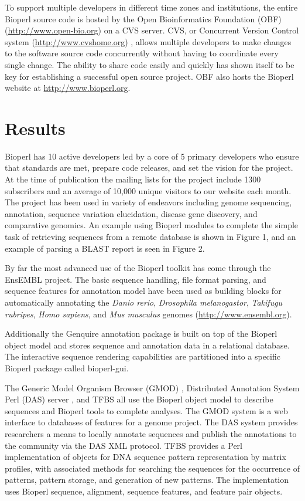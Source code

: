 \documentclass[12pt]{article}
\begin{document}
To support multiple developers in different time zones and
institutions, the entire Bioperl source code is hosted by the Open
Bioinformatics Foundation (OBF) (\url{http://www.open-bio.org}) on a
CVS server.  CVS, or Concurrent Version Control system
(\url{http://www.cvshome.org}) \cite{cvsbook}, allows multiple
developers to make changes to the software source code concurrently
without having to coordinate every single change.  The ability to
share code easily and quickly has shown itself to be key for
establishing a successful open source project.  OBF also hosts the
Bioperl website at \url{http://www.bioperl.org}.

\section{Results}

Bioperl has 10 active developers led by a core of 5 primary developers
who ensure that standards are met, prepare code releases, and set the
vision for the project.  At the time of publication the mailing lists
for the project include 1300 subscribers and an average of 10,000
unique visitors to our website each month.  The project has been used
in variety of endeavors including genome sequencing, annotation,
sequence variation elucidation, disease gene discovery, and
comparative genomics.  An example using Bioperl modules to complete
the simple task of retrieving sequences from a remote database is
shown in Figure 1, and an example of parsing a BLAST report is
seen in Figure 2.

By far the most advanced use of the Bioperl toolkit has come through
the EnsEMBL \cite{ensembl-nar} project.  The basic sequence handling,
file format parsing, and sequence features for annotation model have
been used as building blocks for automatically annotating the
\textit{Danio rerio}, \textit{Drosophila melanogastor},
\textit{Takifugu rubripes}, \textit{Homo sapiens}, and \textit{Mus
musculus} genomes (\url{http://www.ensembl.org}).

Additionally the Genquire \cite{genquire} annotation package is built
on top of the Bioperl object model and stores sequence and annotation
data in a relational database.  The interactive sequence rendering
capabilities are partitioned into a specific Bioperl package called
bioperl-gui.

The Generic Model Organism Browser (GMOD) \cite{gmod}, Distributed
Annotation System Perl (DAS) server \cite{das}, and TFBS
\cite{tfbs} all use the Bioperl object model to describe sequences and
Bioperl tools to complete analyses.  The GMOD system is a web
interface to databases of features for a genome project.  The DAS
system provides researchers a means to locally annotate sequences and
publish the annotations to the community via the DAS XML protocol.
TFBS provides a Perl implementation of objects for DNA sequence pattern
representation by matrix profiles, with associated methods for searching
the sequences for the occurrence of patterns, pattern storage, and
generation of new patterns. The implementation uses Bioperl sequence,
alignment, sequence features, and feature pair objects.
\end{document}
